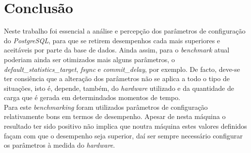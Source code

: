 \section{Conclusão}

Neste trabalho foi essencial a análise e percepção dos parâmetros de configuração do \textit{PostgreSQL}, para que se retirem desempenhos cada mais superiores e aceitáveis por parte da base de dados. Ainda assim, para o \textit{benchmark} atual poderiam ainda ser otimizados mais alguns parâmetros, o \textit{default\_statistics\_target}, \textit{fsync} e \textit{commit\_delay}, por exemplo. De facto, deve-se ter consiência que a alteração dos parâmetros não se aplica a todo o tipo de situações, isto é, depende, também, do \textit{hardware} utilizado e da quantidade de carga que é gerada em determindados momentos de tempo.\\

Para este \textit{benchmarking} foram utilizados parâmetros de configuração relativamente bons em termos de desempenho. Apesar de nesta máquina o resultado ter sido positivo não implica que noutra máquina estes valores definidos façam com que o desempenho seja superior, daí ser sempre necessário configurar os parâmetros à medida do \textit{hardware}.

